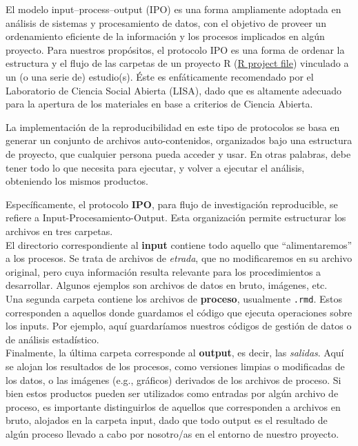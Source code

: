 \documentclass[
]{book}
\begin{document}
El modelo input--process--output (IPO) es una forma ampliamente adoptada en análisis de sistemas y procesamiento de datos, con el objetivo de proveer un ordenamiento eficiente de la información y los procesos implicados en algún proyecto. Para nuestros propósitos, el protocolo IPO es una forma de ordenar la estructura y el flujo de las carpetas de un proyecto R (\href{https://support.posit.co/hc/en-us/articles/200526207-Using-RStudio-Projects}{R project file}) vinculado a un (o una serie de) estudio(s). Éste es enfáticamente recomendado por el Laboratorio de Ciencia Social Abierta (LISA), dado que es altamente adecuado para la apertura de los materiales en base a criterios de Ciencia Abierta.

La implementación de la reproducibilidad en este tipo de protocolos se basa en generar un conjunto de archivos auto-contenidos, organizados bajo una estructura de proyecto, que cualquier persona pueda acceder y usar. En otras palabras, debe tener todo lo que necesita para ejecutar, y volver a ejecutar el análisis, obteniendo los mismos productos.

Específicamente, el protocolo \textbf{IPO}, para flujo de investigación reproducible, se refiere a Input-Procesamiento-Output. Esta organización permite estructurar los archivos en tres carpetas.\\
El directorio correspondiente al \textbf{input} contiene todo aquello que ``alimentaremos'' a los procesos. Se trata de archivos de \emph{etrada}, que no modificaremos en su archivo original, pero cuya información resulta relevante para los procedimientos a desarrollar. Algunos ejemplos son archivos de datos en bruto, imágenes, etc.\\
Una segunda carpeta contiene los archivos de \textbf{proceso}, usualmente \texttt{.rmd}. Estos corresponden a aquellos donde guardamos el código que ejecuta operaciones sobre los inputs. Por ejemplo, aquí guardaríamos nuestros códigos de gestión de datos o de análisis estadístico.\\
Finalmente, la última carpeta corresponde al \textbf{output}, es decir, las \emph{salidas}. Aquí se alojan los resultados de los procesos, como versiones limpias o modificadas de los datos, o las imágenes (e.g., gráficos) derivados de los archivos de proceso. Si bien estos productos pueden ser utilizados como entradas por algún archivo de proceso, es importante distinguirlos de aquellos que corresponden a archivos en bruto, alojados en la carpeta input, dado que todo output es el resultado de algún proceso llevado a cabo por nosotro/as en el entorno de nuestro proyecto.
\end{document}
